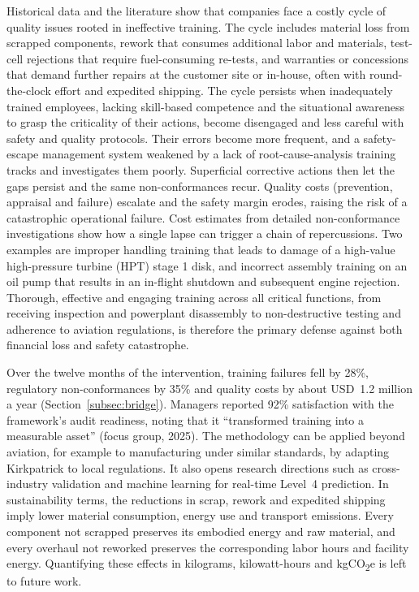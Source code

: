 Historical data and the literature show that \MRO{} companies face a costly cycle of quality issues rooted in ineffective training. The cycle includes material loss from scrapped components, rework that consumes additional labor and materials, test-cell rejections that require fuel-consuming re-tests, and warranties or concessions that demand further repairs at the customer site or in-house, often with round-the-clock effort and expedited shipping. The cycle persists when inadequately trained employees, lacking skill-based competence and the situational awareness to grasp the criticality of their actions, become disengaged and less careful with safety and quality protocols. Their errors become more frequent, and a safety-escape management system weakened by a lack of root-cause-analysis training tracks and investigates them poorly. Superficial corrective actions then let the gaps persist and the same non-conformances recur. Quality costs (prevention, appraisal and failure) escalate and the safety margin erodes, raising the risk of a catastrophic operational failure. Cost estimates from detailed non-conformance investigations show how a single lapse can trigger a chain of repercussions. Two examples are improper handling training that leads to damage of a high-value high-pressure turbine (HPT) stage 1 disk, and incorrect assembly training on an oil pump that results in an in-flight shutdown and subsequent engine rejection.  Thorough, effective and engaging training across all critical \MRO{} functions, from receiving inspection and powerplant disassembly to non-destructive testing and adherence to aviation regulations, is therefore the primary defense against both financial loss and safety catastrophe.

Over the twelve months of the intervention, training failures fell by 28\%, regulatory non-conformances by 35\% and quality costs by about USD~1.2 million a year (Section~\ref{subsec:bridge}).  Managers reported 92\% satisfaction with the framework's audit readiness, noting that it ``transformed training into a measurable asset'' (focus group, 2025). The methodology can be applied beyond aviation, for example to manufacturing under similar standards, by adapting Kirkpatrick to local regulations. It also opens research directions such as cross-industry validation and machine learning for real-time Level~4 prediction. In sustainability terms, the reductions in scrap, rework and expedited shipping imply lower material consumption, energy use and transport emissions. Every component not scrapped preserves its embodied energy and raw material, and every overhaul not reworked preserves the corresponding labor hours and facility energy. Quantifying these effects in kilograms, kilowatt-hours and kgCO\textsubscript{2}e is left to future work.
